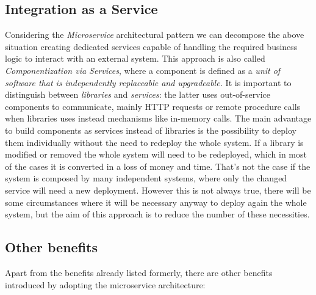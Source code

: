 \subsection{Integration as a Service}
Considering the \textit{Microservice} architectural pattern we can decompose
the above situation creating dedicated services capable of handling the
required business logic to interact with an external system. This approach
is also called \textit{Componentization via Services}\cite{microarch}, where a component is defined
as a \textit{unit of software that is independently replaceable and upgradeable.}
It is important to distinguish between \textit{libraries} and \textit{services}:
the latter uses out-of-service components to communicate, mainly HTTP requests or
remote procedure calls when libraries uses instead mechanisms like in-memory calls.
The main advantage to build components as services instead of libraries is the
possibility to deploy them individually without the need to redeploy the whole system.
If a library is modified or removed the whole system will need to be redeployed,
which in most of the cases it is converted in a loss of money and time. That's not
the case if the system is composed by many independent systems, where only the changed
service will need a new deployment. However this is not always true, there will be some
circumstances where it will be necessary anyway to deploy again the whole system, but the
aim of this approach is to reduce the number of these necessities.

\subsection{Other benefits}
Apart from the benefits already listed formerly, there are other benefits introduced by
adopting the microservice architecture:

